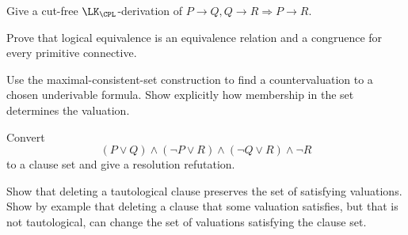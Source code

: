 \begin{exercise}
\label{ex:prop-metatheory-08}
Give a cut-free \(\LK_{\CPL}\)-derivation of
\(P\to Q, Q\to R\Rightarrow P\to R\).
\end{exercise}

\begin{exercise}
\label{ex:prop-metatheory-09}
Prove that logical equivalence is an equivalence relation and a congruence for
every primitive connective.
\end{exercise}

\begin{exercise}
\label{ex:prop-metatheory-10}
Use the maximal-consistent-set construction to find a countervaluation to a
chosen underivable formula.  Show explicitly how membership in the
set determines the valuation.
\end{exercise}

\begin{exercise}
\label{ex:prop-metatheory-11}
Convert
\[
 (P\lor Q)\land(\neg P\lor R)\land(\neg Q\lor R)\land\neg R
\]
to a clause set and give a resolution refutation.
\end{exercise}

\begin{exercise}
\label{ex:prop-metatheory-12}
Show that deleting a tautological clause preserves the set of satisfying
valuations.  Show by example that deleting a clause that some valuation
satisfies, but that is not tautological, can change the set of valuations
satisfying the clause set.
\end{exercise}

